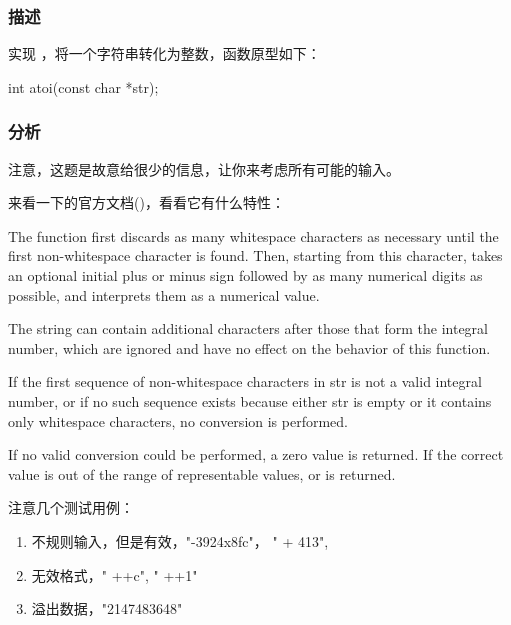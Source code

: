 \subsubsection{描述}
实现 ，将一个字符串转化为整数，函数原型如下：
\begin{Code}
int atoi(const char *str);
\end{Code}


\subsubsection{分析}
注意，这题是故意给很少的信息，让你来考虑所有可能的输入。

来看一下的官方文档()，看看它有什么特性：

The function first discards as many whitespace characters as necessary until the first non-whitespace character is found. Then, starting from this character, takes an optional initial plus or minus sign followed by as many numerical digits as possible, and interprets them as a numerical value.

The string can contain additional characters after those that form the integral number, which are ignored and have no effect on the behavior of this function.

If the first sequence of non-whitespace characters in str is not a valid integral number, or if no such sequence exists because either str is empty or it contains only whitespace characters, no conversion is performed.

If no valid conversion could be performed, a zero value is returned. If the correct value is out of the range of representable values,   or   is returned.

注意几个测试用例：
\begin{enumerate}
\item 不规则输入，但是有效，"-3924x8fc"， "  +  413",
\item 无效格式，" ++c", " ++1"
\item 溢出数据，"2147483648"
\end{enumerate}


